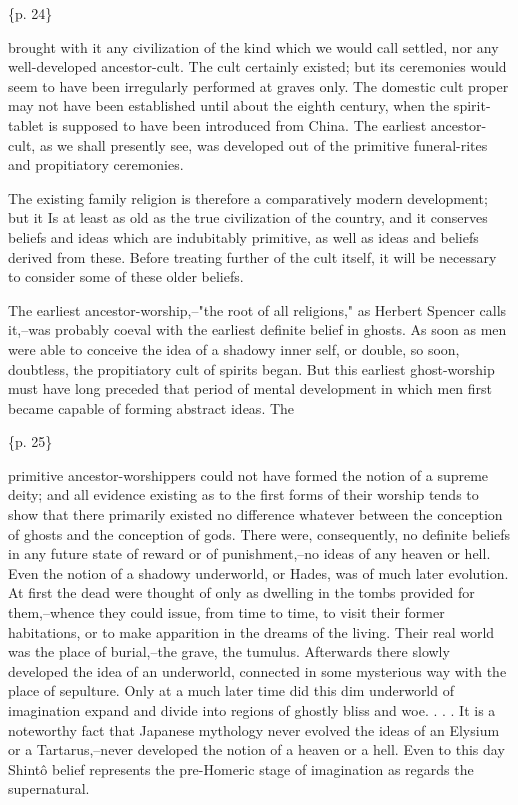 \{p. 24\}

brought with it any civilization of the kind which we would call settled, nor any well-developed ancestor-cult. The cult certainly existed; but its ceremonies would seem to have been irregularly performed at graves only. The domestic cult proper may not have been established until about the eighth century, when the spirit-tablet is supposed to have been introduced from China. The earliest ancestor-cult, as we shall presently see, was developed out of the primitive funeral-rites and propitiatory ceremonies.

The existing family religion is therefore a comparatively modern development; but it Is at least as old as the true civilization of the country, and it conserves beliefs and ideas which are indubitably primitive, as well as ideas and beliefs derived from these. Before treating further of the cult itself, it will be necessary to consider some of these older beliefs.



The earliest ancestor-worship,--"the root of all religions," as Herbert Spencer calls it,--was probably coeval with the earliest definite belief in ghosts. As soon as men were able to conceive the idea of a shadowy inner self, or double, so soon, doubtless, the propitiatory cult of spirits began. But this earliest ghost-worship must have long preceded that period of mental development in which men first became capable of forming abstract ideas. The

\{p. 25\}

primitive ancestor-worshippers could not have formed the notion of a supreme deity; and all evidence existing as to the first forms of their worship tends to show that there primarily existed no difference whatever between the conception of ghosts and the conception of gods. There were, consequently, no definite beliefs in any future state of reward or of punishment,--no ideas of any heaven or hell. Even the notion of a shadowy underworld, or Hades, was of much later evolution. At first the dead were thought of only as dwelling in the tombs provided for them,--whence they could issue, from time to time, to visit their former habitations, or to make apparition in the dreams of the living. Their real world was the place of burial,--the grave, the tumulus. Afterwards there slowly developed the idea of an underworld, connected in some mysterious way with the place of sepulture. Only at a much later time did this dim underworld of imagination expand and divide into regions of ghostly bliss and woe. . . . It is a noteworthy fact that Japanese mythology never evolved the ideas of an Elysium or a Tartarus,--never developed the notion of a heaven or a hell. Even to this day Shintô belief represents the pre-Homeric stage of imagination as regards the supernatural.

